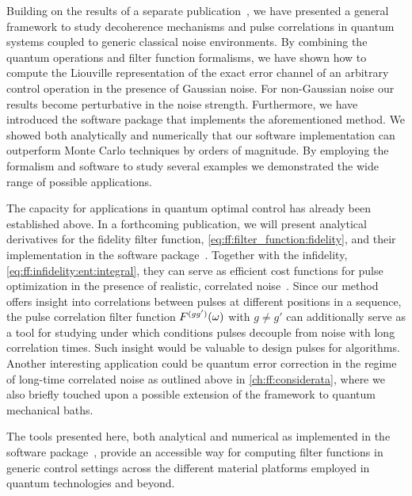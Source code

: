 Building on the results of a separate publication~\cite{Cerfontaine2021}, we have presented a general framework to study decoherence mechanisms and pulse correlations in quantum systems coupled to generic classical noise environments.
By combining the quantum operations and filter function formalisms, we have shown how to compute the Liouville representation of the exact error channel of an arbitrary control operation in the presence of Gaussian noise.
For non-Gaussian noise our results become perturbative in the noise strength.
Furthermore, we have introduced the \filterfunctions \python software package that implements the aforementioned method.
We showed both analytically and numerically that our software implementation can outperform Monte Carlo techniques by orders of magnitude.
By employing the formalism and software to study several examples we demonstrated the wide range of possible applications.

The capacity for applications in quantum optimal control has already been established above.
In a forthcoming publication, we will present analytical derivatives for the fidelity filter function, \cref{eq:ff:filter_function:fidelity}, and their implementation in the software package~\cite{Le2022}.
Together with the infidelity, \cref{eq:ff:infidelity:ent:integral}, they can serve as efficient cost functions for pulse optimization in the presence of realistic, correlated noise~\cite{Teske2021,Teske2022}.
Since our method offers insight into correlations between pulses at different positions in a sequence, the pulse correlation filter function $F^{(gg')}(\omega)$ with $g\neq g'$ can additionally serve as a tool for studying under which conditions pulses decouple from noise with long correlation times.
Such insight would be valuable to design pulses for algorithms.
Another interesting application could be quantum error correction in the regime of long-time correlated noise as outlined above in \cref{ch:ff:considerata}, where we also briefly touched upon a possible extension of the framework to quantum mechanical baths.

The tools presented here, both analytical and numerical as implemented in the \filterfunctions software package~\cite{Hangleiter_ff}, provide an accessible way for computing filter functions in generic control settings across the different material platforms employed in quantum technologies and beyond.

